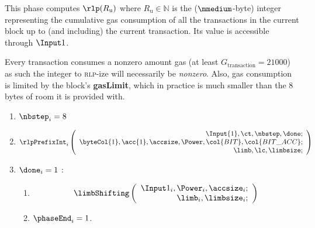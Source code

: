 \begin{center}
\end{center}

This phase computes $\rlp(R_\text{u})$ where $R_\text{u} \in \mathbb{N}$  is the ($\mmedium$-byte) integer representing the cumulative gas consumption of all the transactions in the current block up to (and including) the current transaction. Its value is accessible through $\Input 1$.

\saNote{}
Every transaction consumes a nonzero amount gas (at least $G_\text{transaction} = 21000$) as such the integer to \textsc{rlp}-ize will necessarily be \emph{nonzero}.
Also, gas consumption is limited by the block's \textbf{gasLimit}, which in practice is much smaller than the $8$ bytes of room it is provided with.

\begin{enumerate}
    \item $\nbstep_{i} = 8$
    \item
        \[
            \rlpPrefixInt_{i}
            \left(
            \begin{array}{r}
                \Input{1},
                \ct,
                \nbstep,
                \done; \\
                \byteCol{1},
                \acc{1},
                \accsize,
                \Power,
                \col{BIT},
                \col{BIT\_ACC}; \\
                \limb,
                \lc,
                \limbsize; \\
            \end{array}
            \right)
        \]
    \item \If $\done_{i}=1$ \Then:
    \begin{enumerate}
        \item \[
    \limbShifting
    \left(
    \begin{array}{r}
        \Input 1_{i},
        \Power_{i},
        \accsize_{i}; \\
        \limb_{i},
        \limbsize_{i}; \\
    \end{array}
    \right)
\]
        \item $\phaseEnd_{i}=1$.  
    \end{enumerate} 
\end{enumerate}
